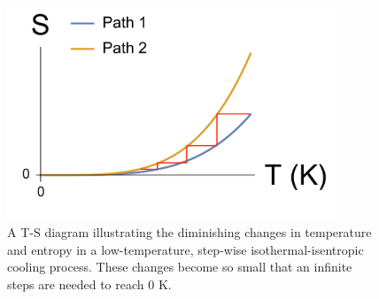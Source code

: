 \documentclass[12pt]{article}
\begin{document}
\begin{figure}[h]
\centering
\includegraphics[width = 10cm]{Can_We_achieve_0K.pdf}
\caption{A T-S diagram illustrating the diminishing changes in temperature and entropy in a low-temperature, step-wise isothermal-isentropic cooling process. These changes become so small that an infinite steps are needed to reach 0 K.}
\label{Can_We_Reach_0_K}
\end{figure}
\end{document}
